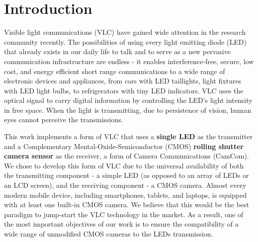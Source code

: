 \section{Introduction}

Visible light communications (VLC) have gained wide attention in the research community recently.
The possibilities of using every light emitting diode (LED) that already exists in our daily life to talk and to serve as
a new pervasive communication infrastructure are endless - it enables interference-free, secure, low cost, and energy efficient short range communications to a wide range of electronic devices and appliances, from cars with LED taillights, light fixtures with LED light bulbs, to refrigerators with tiny LED indicators. VLC uses the optical signal to carry digital information by controlling the LED's light intensity in free space. When the light is transmitting, due to persistence of vision, human eyes cannot perceive the transmissions. 

This work implements a form of VLC that uses a \textbf{single LED} as the transmitter and a Complementary Mental-Oxide-Semiconductor (CMOS) \textbf{rolling shutter camera sensor} as the receiver, a form of Camera Communications (CamCom).
We chose to develop this form of VLC due to the universal availability of both the transmitting component - a simple LED (as opposed to an array of LEDs or an LCD screen), and the receiving component - a CMOS camera. 
Almost every modern mobile device, including smartphones, tablets, and laptops, is equipped with at least one built-in CMOS camera. 
We believe that this would be the best paradigm to jump-start the VLC technology in the market.
As a result, one of the most important objectives of our work is to ensure the compatibility of a wide range of unmodified CMOS cameras to the LEDs transmission.  


